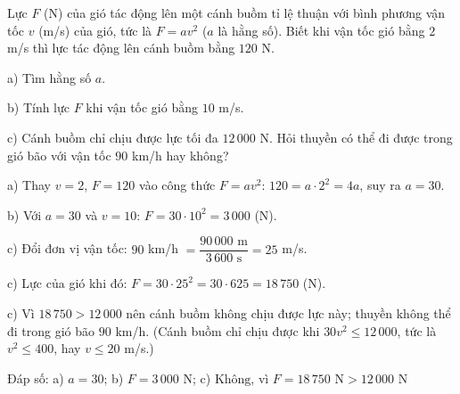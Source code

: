 \begin{problem}[9DS-HSB2-010]
Lực $F$ (N) của gió tác động lên một cánh buồm tỉ lệ thuận với bình phương vận tốc $v$ (m/s) của gió, tức là $F = av^2$ ($a$ là hằng số). Biết khi vận tốc gió bằng $2$ m/s thì lực tác động lên cánh buồm bằng $120$ N.

a) Tìm hằng số $a$.

b) Tính lực $F$ khi vận tốc gió bằng $10$ m/s.

c) Cánh buồm chỉ chịu được lực tối đa $12\,000$ N. Hỏi thuyền có thể đi được trong gió bão với vận tốc $90$ km/h hay không?

\begin{solution}
a) Thay $v = 2$, $F = 120$ vào công thức $F = av^2$: $120 = a \cdot 2^2 = 4a$, suy ra $a = 30$.

b) Với $a = 30$ và $v = 10$: $F = 30 \cdot 10^2 = 3\,000$ (N).

c) Đổi đơn vị vận tốc: $90$ km/h $= \dfrac{90\,000 \text{ m}}{3\,600 \text{ s}} = 25$ m/s.

c) Lực của gió khi đó: $F = 30 \cdot 25^2 = 30 \cdot 625 = 18\,750$ (N).

c) Vì $18\,750 > 12\,000$ nên cánh buồm không chịu được lực này; thuyền không thể đi trong gió bão $90$ km/h. (Cánh buồm chỉ chịu được khi $30v^2 \leq 12\,000$, tức là $v^2 \leq 400$, hay $v \leq 20$ m/s.)

Đáp số: a) $\boxed{a = 30}$; b) $\boxed{F = 3\,000 \text{ N}}$; c) $\boxed{\text{Không, vì } F = 18\,750 \text{ N} > 12\,000 \text{ N}}$
\end{solution}
\end{problem}


